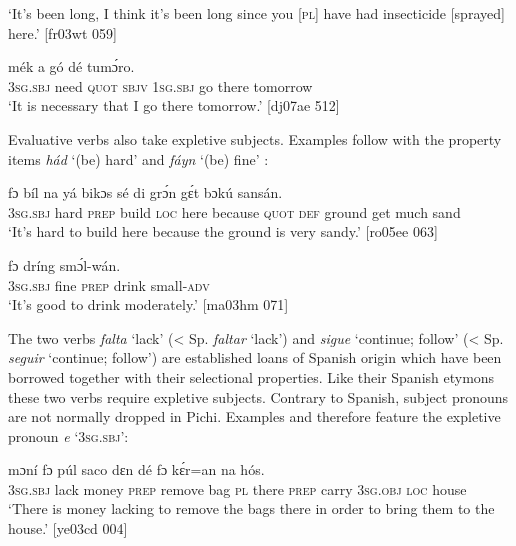 \glt ‘It’s been long, I think it’s been long since you [\textsc{pl}] have had insecticide 
[sprayed] here.’ [fr03wt 059]
\z


\ea%
    \label{ex:key:1145}
    \gll {}           mék    a    gó  dé    tumɔ́ro.\\
\textsc{3sg.sbj}  need  \textsc{quot}    \textsc{sbjv}    \textsc{1sg.sbj}  go  there  tomorrow\\

\glt ‘It is necessary that I go there tomorrow.’ [dj07ae 512]
\z

Evaluative verbs also take expletive subjects. Examples follow with the property items \textit{hád} ‘(be) hard’  and \textit{fáyn} ‘(be) fine’ : 


\ea%
    \label{ex:key:1146}
    \gll {}        fɔ  bíl    na  yá    bikɔs  sé    di  grɔ́n 
gɛ́t  bɔkú  sansán.\\
\textsc{3sg.sbj}  hard  \textsc{prep}  build  \textsc{loc}  here    because  \textsc{quot}    \textsc{def}  ground
get  much  sand\\

\glt ‘It’s hard to build here because the ground is very sandy.’ [ro05ee 063]
\z


\ea%
    \label{ex:key:1147}
    \gll {}     fɔ  dríng  smɔ́l-wán.\\
\textsc{3sg.sbj}  fine    \textsc{prep}  drink  small\textsc{{}-adv}\\

\glt ‘It’s good to drink moderately.’ [ma03hm 071]
\z

The two verbs \textit{falta} ‘lack’ (< Sp. \textit{faltar} ‘lack’) and \textit{sigue} ‘continue; follow’ (< Sp. \textit{seguir} ‘continue; follow’) are established loans of Spanish origin which have been borrowed together with their selectional properties. Like their Spanish etymons these two verbs require expletive subjects. Contrary to Spanish, subject pronouns are not normally dropped in Pichi. Examples  and  therefore feature the expletive pronoun \textit{e} \textsc{‘3sg.sbj’}:


\ea%
    \label{ex:key:1148}
    \gll {}      mɔní  fɔ  púl    saco    dɛn  dé    fɔ
kɛ́r=an    na  hós.\\
\textsc{3sg.sbj}  lack    money  \textsc{prep}  remove  bag    \textsc{pl}  there  \textsc{prep}
carry \textsc{3sg.obj}  \textsc{loc}  house\\
\glt ‘There is money lacking to remove the bags there in order to bring 
them to the house.’ [ye03cd 004]
\z


